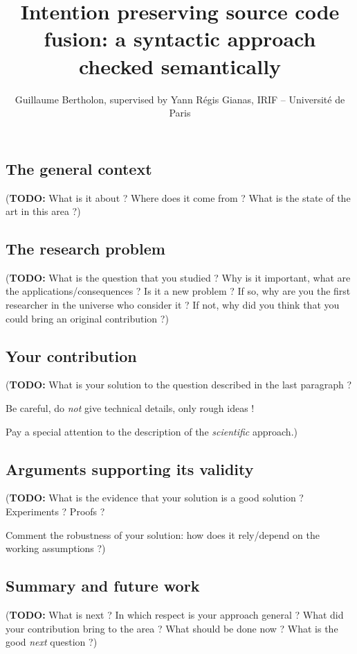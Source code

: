\documentclass[a4paper,11pt]{article}
\title{Intention preserving source code fusion: a syntactic approach checked semantically}
\author{Guillaume Bertholon, supervised by Yann Régis Gianas, IRIF -- Université de Paris}
\newcommand\todo[1]{{\color{teal}(\textbf{TODO:} #1)}}
\begin{document}
\maketitle

\subsection*{The general context}
\todo{What is it about ? Where does it come from ? What is the state of the art in this area ?}

\subsection*{The research problem}

\todo{What is the question that you studied ?
Why is it important, what are the applications/consequences ?
Is it a new problem ?
If so, why are you the first researcher in the universe who consider it ?
If not, why did you think that you could bring an original contribution ?}

\subsection*{Your contribution}

\todo{What is your solution to the question described in the last paragraph ?

Be careful, do \emph{not} give technical details, only rough ideas !

Pay a special attention to the description  of the \emph{scientific} approach.}

\subsection*{Arguments supporting its validity}

\todo{What is the evidence that your solution is a good solution ?
Experiments ? Proofs ?

Comment the robustness of your solution: how does it rely/depend on the working assumptions ?}

\subsection*{Summary and future work}

\todo{What is next ? In which respect is your approach general ?
What did your contribution bring to the area ?
What should be done now ?
What is the good \emph{next} question ?}
\end{document}
